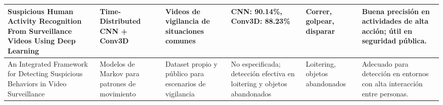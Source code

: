 \begin{landscape}
\begin{longtable}{|p{5cm}|p{4cm}|p{3cm}|p{2cm}|p{3cm}|p{5cm}|}
    Suspicious Human Activity Recognition From Surveillance Videos Using Deep Learning & Time-Distributed CNN + Conv3D & Videos de vigilancia de situaciones comunes & CNN: 90.14\%, Conv3D: 88.23\% & Correr, golpear, disparar & Buena precisión en actividades de alta acción; útil en seguridad pública. \\ \hline
    An Integrated Framework for Detecting Suspicious Behaviors in Video Surveillance & Modelos de Markov para patrones de movimiento & Dataset propio y público para escenarios de vigilancia & No especificada; detección efectiva en loitering y objetos abandonados & Loitering, objetos abandonados & Adecuado para detección en entornos con alta interacción entre personas. \\ \hline
\end{longtable}
\end{landscape}



